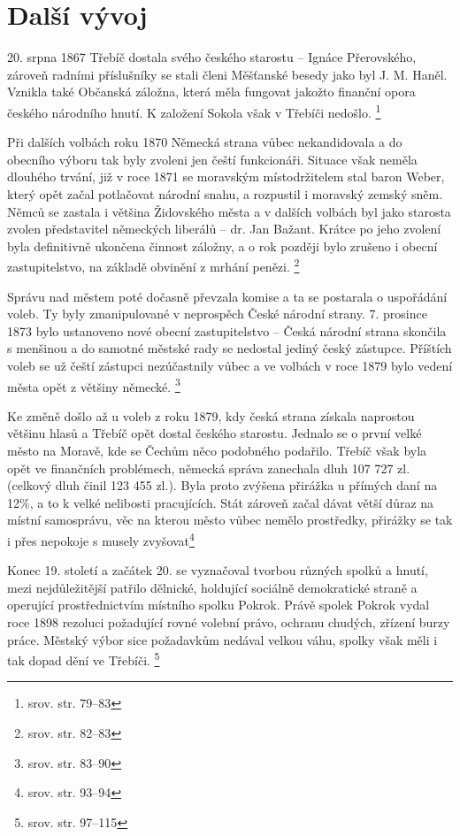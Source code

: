 \documentclass[a4paper,oneside,12pt]{report}
\begin{document}
\section{Další vývoj}

20. srpna 1867 Třebíč dostala svého českého starostu -- Ignáce Přerovského, zároveň radními příslušníky se stali členi Měšťanské besedy jako byl J. M. Haněl.
Vznikla také Občanská záložna, která měla fungovat jakožto finanční opora českého národního hnutí.
K založení Sokola však v Třebíči nedošlo. \footnote{srov. \cite{Janak1981} str. 79--83}

Při dalších volbách roku 1870 Německá strana vůbec nekandidovala a do obecního výboru tak byly zvoleni jen čeští funkcionáři.
Situace však neměla dlouhého trvání, již v roce 1871 se moravským místodržitelem stal baron Weber, který opět začal potlačovat národní snahu, a rozpustil i moravský zemský sněm.
Němců se zastala i většina Židovského města a v dalších volbách byl jako starosta zvolen představitel německých liberálů -- dr. Jan Bažant.
Krátce po jeho zvolení byla definitivně ukončena činnost záložny, a o rok později bylo zrušeno i obecní zastupitelstvo, na základě obvinění z mrhání penězi. \footnote{srov. \cite{Janak1981} str. 82--83}

Správu nad městem poté dočasně převzala komise a ta se postarala o uspořádání voleb.
Ty byly zmanipulované v neprospěch České národní strany.
7. prosince 1873 bylo ustanoveno nové obecní zastupitelstvo -- Česká národní strana skončila s menšinou a do samotné městské rady se nedostal jediný český zástupce.
Příštích voleb se už čeští zástupci nezúčastnily vůbec a ve volbách v roce 1879 bylo vedení města opět z většiny německé. \footnote{srov. \cite{Janak1981} str. 83--90}

Ke změně došlo až u voleb z roku 1879, kdy česká strana získala naprostou většinu hlasů a Třebíč opět dostal českého starostu.
Jednalo se o první velké město na Moravě, kde se Čechům něco podobného podařilo.
Třebíč však byla opět ve finančních problémech, německá správa zanechala dluh 107 727 zl. (celkový dluh činil 123 455 zl.).
Byla proto zvýšena přirážka u přímých daní na 12\%, a to k velké nelibosti pracujících.
Stát zároveň začal dávat větší důraz na místní samosprávu, věc na kterou město vůbec nemělo prostředky, přirážky se tak i přes nepokoje s musely zvyšovat\footnote{srov. \cite{Janak1981} str. 93--94}

Konec 19. století a začátek 20. se vyznačoval tvorbou různých spolků a hnutí, mezi nejdůležitější patřilo dělnické, holdující sociálně demokratické straně a operující prostřednictvím místního spolku Pokrok.
Právě spolek Pokrok vydal roce 1898 rezoluci požadující rovné volební právo, ochranu chudých, zřízení burzy práce.
Městský výbor sice požadavkům nedával velkou váhu, spolky však měli i tak dopad dění ve Třebíči. \footnote{srov. \cite{Janak1981} str. 97--115}
\end{document}
